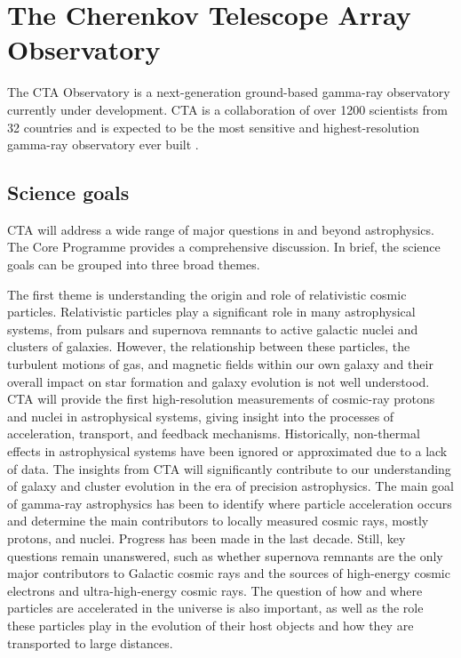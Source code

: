 \section{The Cherenkov Telescope Array Observatory}
\label{s:CTA}
The CTA Observatory is a next-generation ground-based gamma-ray observatory currently under development. CTA is a collaboration of over 1200 scientists from 32 countries and is expected to be the most sensitive and highest-resolution gamma-ray observatory ever built \cite{ScienceWithCherenkovTelescopeArray2018}.

\subsection{Science goals}
\label{s:science-goals}
CTA will address a wide range of major questions in and beyond astrophysics. The Core Programme \cite{ScienceWithCherenkovTelescopeArray2018} provides a comprehensive discussion. In brief, the science goals can be grouped into three broad themes. 

The first theme is understanding the origin and role of relativistic cosmic particles. Relativistic particles play a significant role in many astrophysical systems, from pulsars and supernova remnants to active galactic nuclei and clusters of galaxies. However, the relationship between these particles, the turbulent motions of gas, and magnetic fields within our own galaxy and their overall impact on star formation and galaxy evolution is not well understood. CTA will provide the first high-resolution measurements of cosmic-ray protons and nuclei in astrophysical systems, giving insight into the processes of acceleration, transport, and feedback mechanisms. Historically, non-thermal effects in astrophysical systems have been ignored or approximated due to a lack of data. The insights from CTA will significantly contribute to our understanding of galaxy and cluster evolution in the era of precision astrophysics. The main goal of gamma-ray astrophysics has been to identify where particle acceleration occurs and determine the main contributors to locally measured cosmic rays, mostly protons, and nuclei. Progress has been made in the last decade. Still, key questions remain unanswered, such as whether supernova remnants are the only major contributors to Galactic cosmic rays and the sources of high-energy cosmic electrons and ultra-high-energy cosmic rays. The question of how and where particles are accelerated in the universe is also important, as well as the role these particles play in the evolution of their host objects and how they are transported to large distances.


